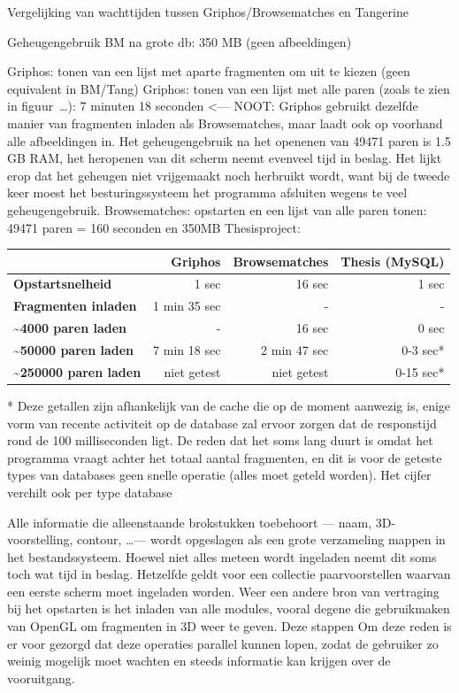Vergelijking van wachttijden tussen Griphos/Browsematches en Tangerine

Geheugengebruik BM na grote db: 350 MB (geen afbeeldingen)

Griphos: tonen van een lijst met aparte fragmenten om uit te kiezen (geen equivalent in BM/Tang)
Griphos: tonen van een lijst met alle paren (zoals te zien in figuur~\ldots): 7 minuten 18 seconden <--- NOOT: Griphos gebruikt dezelfde manier van fragmenten inladen als Browsematches, maar laadt ook op voorhand alle afbeeldingen in. Het geheugengebruik na het openenen van 49471 paren is 1.5 GB RAM, het heropenen van dit scherm neemt evenveel tijd in beslag. Het lijkt erop dat het geheugen niet vrijgemaakt noch herbruikt wordt, want bij de tweede keer moest het besturingssysteem het programma afsluiten wegens te veel geheugengebruik.
Browsematches: opstarten en een lijst van alle paren tonen: 49471 paren = 160 seconden en 350MB
Thesisproject: 

\begin{center}
	\begin{tabular}{|l|r|r|r|}
	    \rowcolor{gray!75}
	    \hline
	    & \textbf{Griphos} &  \textbf{Browsematches} & \textbf{Thesis (MySQL)} \\
	    \hline
	    \textbf{Opstartsnelheid} & 1 sec & 16 sec & 1 sec \\
	    \textbf{Fragmenten inladen} & 1 min 35 sec  & - & - \\
	    \textbf{\textasciitilde 4000 paren laden} & - & 16 sec & 0 sec \\
	    \textbf{\textasciitilde 50000 paren laden} & 7 min 18 sec & 2 min 47 sec  & 0-3 sec* \\
	    \textbf{\textasciitilde 250000 paren laden} & niet getest & niet getest & 0-15 sec* \\
	    \hline
	\end{tabular}
\end{center}

* Deze getallen zijn afhankelijk van de cache die op de moment aanwezig is, enige vorm van recente activiteit op de database zal ervoor zorgen dat de responstijd rond de 100 milliseconden ligt. De reden dat het soms lang duurt is omdat het programma vraagt achter het totaal aantal fragmenten, en dit is voor de geteste types van databases geen snelle operatie (alles moet geteld worden). Het cijfer verchilt ook per type database

Alle informatie die alleenstaande brokstukken toebehoort --- naam, 3D-voorstelling, contour, \ldots --- wordt opgeslagen als een grote verzameling mappen in het bestandssysteem. Hoewel niet alles meteen wordt ingeladen neemt dit soms toch wat tijd in beslag. Hetzelfde geldt voor een collectie paarvoorstellen waarvan een eerste scherm moet ingeladen worden. Weer een andere bron van vertraging bij het opstarten is het inladen van alle modules, vooral degene die gebruikmaken van OpenGL om fragmenten in 3D weer te geven. Deze stappen  Om deze reden is er voor gezorgd dat deze operaties parallel kunnen lopen, zodat de gebruiker zo weinig mogelijk moet wachten en steeds informatie kan krijgen over de vooruitgang.


